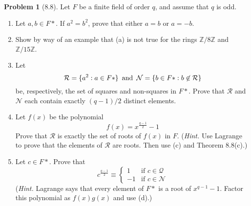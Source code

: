 \documentclass[12pt]{article}
\theoremstyle{definition}
\newtheorem{problem}{Problem}
\begin{document}
\begin{problem}[8.8]
    Let $F$ be a finite field of order $q$, and assume that $q$ is odd.
    \begin{enumerate}[label=(\alph*)]
        \item Let $a, b \in F*$. If $a^2 = b^2$, prove that either $a = b$ or $a = -b$.
        \begin{solution}

        \end{solution}

        \item Show by way of an example that (a) is not true for the rings $\mathbb{Z}/8\mathbb{Z}$
              and $\mathbb{Z}/15\mathbb{Z}$.
        \begin{solution}

        \end{solution}

        \item Let 
        \[
            \mathcal{R} = \{ a^2 : a \in F* \} \hspace{5px} \text{and} \hspace{5px} \mathcal{N} = \{ b \in F* : b \not\in \mathcal{R} \}
        \]
        be, respectively, the set of squares and non-squares in $F*$. Prove that $\mathcal{R}$ and $\mathcal{N}$ each contain
        exactly $(q - 1)/2$ distinct elements.
        \begin{solution}

        \end{solution}

        \item Let $f(x)$ be the polynomial
              \[
                f(x) = x^{\frac{q-1}{2}} - 1
              \]
              Prove that $\mathcal{R}$ is exactly the set of roots of $f(x)$ in $F$. (\textit{Hint.} Use Lagrange
              to prove that the elements of $\mathcal{R}$ are roots. Then use (c) and Theorem 8.8(c).)
        \begin{solution}

        \end{solution}

        \item Let $c \in F*$. Prove that
              \[ 
                c^{\frac{q-1}{2}} \equiv 
                \begin{cases} 
                    1 & \text{if } c \in \mathcal{Q}\\
                    -1 & \text{if } c \in \mathcal{N}
                \end{cases}
              \]
              (\textit{Hint.} Lagrange says that every element of $F*$ is a root of $x^{q-1} - 1$.
              Factor this polynomial as $f(x)g(x)$ and use (d).)
        \begin{solution}


\end{solution}
\end{enumerate}
\end{problem}
\end{document}
